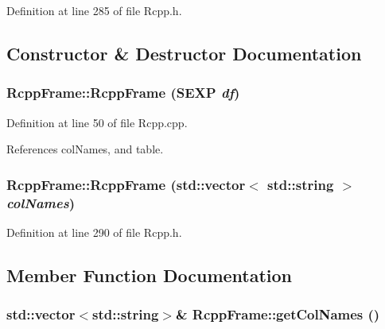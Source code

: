 Definition at line 285 of file Rcpp.h.

\subsection{Constructor \& Destructor Documentation}
\hypertarget{classRcppFrame_2aad548eb7d3842ea12da3c5a67bbfbc}{
\subsubsection[RcppFrame]{\setlength{\rightskip}{0pt plus 5cm}RcppFrame::RcppFrame (SEXP {\em df})}}
\label{classRcppFrame_2aad548eb7d3842ea12da3c5a67bbfbc}




Definition at line 50 of file Rcpp.cpp.

References colNames, and table.\hypertarget{classRcppFrame_d3caf84a0543c0f31a97705be8902358}{
\subsubsection[RcppFrame]{\setlength{\rightskip}{0pt plus 5cm}RcppFrame::RcppFrame (std::vector$<$ std::string $>$ {\em colNames})}}
\label{classRcppFrame_d3caf84a0543c0f31a97705be8902358}




Definition at line 290 of file Rcpp.h.

\subsection{Member Function Documentation}
\hypertarget{classRcppFrame_d220bfd289e745d13a99ffe323a00200}{
\subsubsection[getColNames]{\setlength{\rightskip}{0pt plus 5cm}std::vector$<$std::string$>$\& RcppFrame::getColNames ()}}
\label{classRcppFrame_d220bfd289e745d13a99ffe323a00200}




